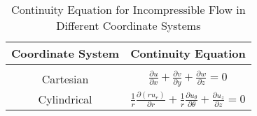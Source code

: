 \begin{table}[h]
    \centering
    \caption{Continuity Equation for Incompressible Flow in Different Coordinate Systems}
    \begin{tabular}{cc}
        \toprule
        Coordinate System & Continuity Equation \\
        \hline \\[-1ex]
        Cartesian & \(\displaystyle \frac{\partial u}{\partial x} + \frac{\partial v}{\partial y} + \frac{\partial w}{\partial z} = 0\) \\[3ex]
        Cylindrical & \(\displaystyle \frac{1}{r} \frac{\partial (r u_r)}{\partial r} + \frac{1}{r} \frac{\partial u_{\theta}}{\partial \theta} + \frac{\partial u_z}{\partial z} = 0\) \\[3ex]
    \end{tabular}
\end{table}


